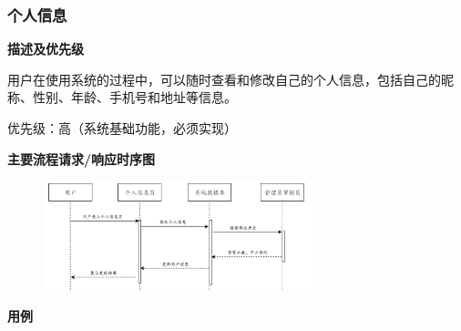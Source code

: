 \documentclass[12pt,a4paper,UTF8]{article}
\begin{document}
\subsubsection{个人信息}

\noindent\textbf{描述及优先级}

用户在使用系统的过程中，可以随时查看和修改自己的个人信息，包括自己的昵称、性别、年龄、手机号和地址等信息。

优先级：高（系统基础功能，必须实现）

\noindent\textbf{主要流程请求/响应时序图}

\begin{figure}[H]
  \centering
  \includegraphics[width=0.7\textwidth]{figures/use323.png}
\end{figure}

\noindent\textbf{用例}
\end{document}
